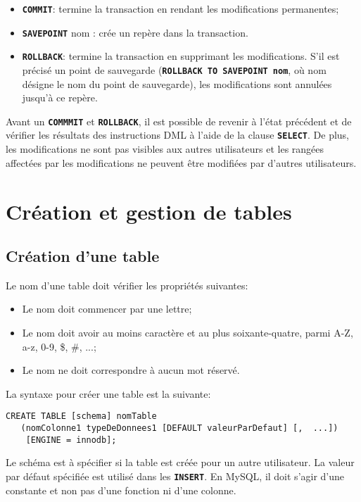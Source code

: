 \documentclass[a4paper, 12pt]{report}
\newcommand{\textSQL}[1]{\texttt{\textbf{#1}}}
\theoremstyle{definition} \newtheorem{ex}{Exemple}
\begin{document}
\begin{itemize}
\item \textSQL{COMMIT}: termine la transaction en rendant les modifications permanentes;
\item \textSQL{SAVEPOINT} nom : crée un repère dans la transaction.
\item \textSQL{ROLLBACK}: termine la transaction en supprimant les modifications. S'il est précisé un point de sauvegarde (\textSQL{ROLLBACK TO SAVEPOINT nom}, où nom désigne le nom du point de sauvegarde), les modifications sont annulées jusqu'à ce repère.
\end{itemize}

Avant un \textSQL{COMMMIT} et \textSQL{ROLLBACK}, il est possible de revenir à l'état précédent et de vérifier les résultats des instructions DML à l'aide de la clause \textSQL{SELECT}. De plus, les modifications ne sont pas visibles aux autres utilisateurs et les rangées affectées par les modifications ne peuvent être modifiées par d'autres utilisateurs.

\chapter{Création et gestion de tables}
\section{Création d'une table}
Le nom d'une table doit vérifier les propriétés suivantes:
\begin{itemize}
  \item Le nom doit commencer par une lettre;
	\item Le nom doit avoir au moins caractère et au plus soixante-quatre, parmi A-Z, a-z, 0-9, \$, \#, ...;
	\item Le nom ne doit correspondre à aucun mot réservé.
\end{itemize}

La syntaxe pour créer une table est la suivante:
\begin{lstlisting}[frame=single]
CREATE TABLE [schema] nomTable
   (nomColonne1 typeDeDonnees1 [DEFAULT valeurParDefaut] [,  ...])
	[ENGINE = innodb];
\end{lstlisting}
Le schéma est à spécifier si la table est créée pour un autre utilisateur. La valeur par défaut spécifiée est utilisé dans les \textSQL{INSERT}. En MySQL, il doit s'agir d'une constante et non pas d'une fonction ni d'une colonne.
\end{document}
